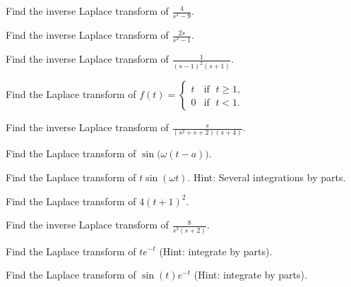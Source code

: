\documentclass[12pt]{book}
\begin{document}
\begin{exercise}
Find the inverse Laplace transform of $\frac{4}{s^2-9}$.
\end{exercise}

\begin{exercise}
Find the inverse Laplace transform of $\frac{2s}{s^2-1}$.
\end{exercise}

\begin{exercise}
Find the inverse Laplace transform of $\frac{1}{{(s-1)}^2(s+1)}$.
\end{exercise}

\begin{exercise}
Find the Laplace transform of $f(t) =
\begin{cases}
t & \text{if } \; t \geq 1, \\
0 & \text{if } \; t < 1.
\end{cases}$
\end{exercise}

\begin{exercise}
Find the inverse Laplace transform of $\frac{s}{(s^2+s+2)(s+4)}$.
\end{exercise}

\begin{exercise}
Find the Laplace transform of $\sin\bigl(\omega (t-a)\bigr)$.
\end{exercise}

\begin{exercise}
Find the Laplace transform of $t\sin(\omega t)$.  Hint: Several integrations
by parts.
\end{exercise}

\setcounter{exercise}{100}

\begin{exercise}
Find the Laplace transform of $4{(t+1)}^2$.
\end{exercise}

\begin{exercise}
Find the inverse Laplace transform of $\frac{8}{s^3(s+2)}$.
\end{exercise}

\begin{exercise}
Find the Laplace transform of $te^{-t}$ (Hint: integrate by parts).
\end{exercise}

\begin{exercise}
Find the Laplace transform of $\sin(t)e^{-t}$ (Hint: integrate by parts).
\end{exercise}
\end{document}

